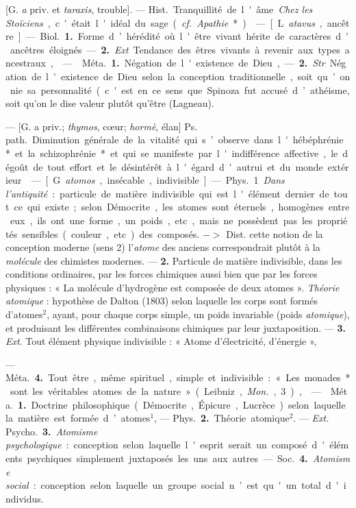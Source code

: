 \begin{itemize}[leftmargin=1cm, label=, itemsep=1pt]
{{ [G. {\it a} priv. et {\it taraxis}, trouble]. — \si{Hist.} Tranquillité de l'âme.
{\it Chez les Stoïciens}, c'était l'idéal du
sage ({\it cf.}  {\it Apathie}*).

 — [L. {\it atavus}, ancêtre] —
\si{Biol.} {\bf 1.} Forme d’hérédité où l'être
vivant hérite de caractères d’ancêtres éloignés. — {\bf 2.} {\it Ext}. Tendance
des êtres vivants à revenir aux types
ancestraux,

 —  \si{Méta.} {\bf 1.} Négation de
l'existence de Dieu, — {\bf 2.} {\it Str}. Négation de l'existence de Dieu selon la
conception traditionnelle, soit qu’on
nie sa personnalité (c'est en ce sens
que Spinoza fut accusé d’athéisme},
soit qu’on le dise valeur plutôt
qu'être (Lagneau).

 — [G. a priv.; {\it thymos}, cœur; {\it hormè}, élan]
\si{Ps. path.} Diminution générale de la vitalité qui s’observe dans
l'hébéphrénie* et la schizophrénie* et qui se manifeste par l'indifférence
affective, le dégoût de tout effort et le désintérêt à l'égard d'autrui et du
monde extérieur.

 — [G. {\it atomos}, insécable, indivisible] — \si{Phys.} 1 {\it Dans l'antiquité} :
particule de matière indivisible qui
est l'élément dernier de tout ce qui
existe; selon Démocrite, les atomes
sont éternels, homogènes entre eux,
ils ont une forme, un poids, etc.,
mais ne possèdent pas les propriétés
sensibles (couleur, etc.) des composés. $->$ Dist. cette notion de la
conception moderne (sens 2)
l'{\it atome} des anciens correspondrait
plutôt à la {\it molécule} des chimistes
modernes. — {\bf 2.} Particule de matière
indivisible, dans les conditions ordinaires, par les forces chimiques
aussi bien que par les forces physiques : « La molécule d'hydrogène
est composée de deux atomes ».
{\it Théorie atomique} : hypothèse de
Dalton (1803) selon laquelle les
corps sont formés d’atomes$^2$, ayant,
pour chaque corps simple, un poids
invariable (poids {\it atomique}), et produisant les différentes combinaisons
chimiques par leur juxtaposition. —
 {\bf 3.} {\it Ext}. Tout élément physique indivisible : « Atome d'électricité,
d'énergie »,

— \si{Méta.} {\bf 4.} Tout être, même spirituel, simple et indivisible : « Les
monades* sont les véritables atomes
de la nature » (Leibniz, {\it Mon.}, 3),

 —  \si{Méta.} {\bf 1.} Doctrine philosophique (Démocrite, Épicure,
Lucrèce) selon laquelle la matière est
formée d’atomes$^1$, — \si{Phys.} {\bf 2.} Théorie
atomique$^2$. — {\it Ext.} \si{Psycho.} {\bf 3.} {\it Atomisme psychologique} : conception
selon laquelle l'esprit serait un
composé d'éléments psychiques
simplement juxtaposés les uns aux
autres. — \si{Soc.} {\bf 4.} {\it Atomisme social} :
conception selon laquelle un groupe
social n’est qu'un total d'individus.

}
\end{itemize}
